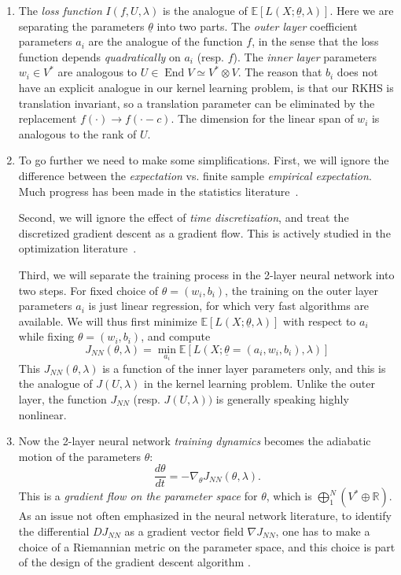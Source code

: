 \documentclass[a4paper]{article}
\theoremstyle{definition}
\newcommand{\R}{\mathbb{R}}
\newcommand{\E}{\mathbb{E}}
\newcommand{\1}{\mathbbm{1}}
\DeclareMathOperator{\End}{End}
\begin{document}
	\begin{enumerate}
		\item The \emph{loss function} $I(f,U,\lambda)$ is the analogue of $\E[L(X; \underline{\theta},\lambda)]$. Here we are separating the parameters $\underline{\theta}$ into two parts. The \emph{outer layer} coefficient parameters $a_i$ are the analogue of the function $f$, in the sense that the loss function depends \emph{quadratically} on $a_i$ (resp. $f$).
		The \emph{inner layer} parameters $w_i\in V^*$ are analogous to $U\in \End{V}\simeq V^*\otimes V$. The reason that $b_i$ does not have an explicit analogue in our kernel learning problem, is that our RKHS is translation invariant, so a translation parameter can be eliminated by the replacement $f(\cdot)\to f(\cdot-c)$. The dimension for the linear span of $w_i$ is analogous to the rank of  $U$. 
		
		
		
		\item   To go further we need to make some simplifications. First, we will ignore the difference between the \emph{expectation}  vs. finite sample \emph{empirical expectation}. Much progress has been made in the statistics literature~\cite{DevroyeGyLugosi, GyorfiKoKrWa}.
		
		
		Second, we will ignore the effect of \emph{time discretization}, and treat the discretized gradient descent as a gradient flow. This is actively studied in the optimization literature~\cite{HelmkeMoore, KushnerYin}.
		
		
		Third, we will separate the training process in the 2-layer neural network into two steps. For fixed choice of $\theta=(w_i, b_i)$, the training on the outer layer parameters $a_i$  is just linear regression, for which very fast algorithms are available. We will thus first minimize $\E[L(X; \underline{\theta} ,\lambda   )]$ with respect to $a_i$ while fixing $\theta=(w_i, b_i)$, and compute 
		\[
		J_{NN}(\theta, \lambda)= \min_{a_i} \E[  L(X; \underline{\theta}=(a_i, w_i,b_i) ,\lambda   )         ]
		\]
		This $J_{NN}(\theta,\lambda)$ is a function of the inner layer parameters only, and this is the analogue of $J(U,\lambda)$ in the kernel learning problem. Unlike the outer layer, the function $J_{NN}$ (resp. $J(U,\lambda))$ is generally speaking highly nonlinear.
		
		
		
		
		\item  Now the 2-layer neural network \emph{training dynamics} becomes the adiabatic motion of the parameters $\theta$:
		\begin{equation}\label{eqn:gradflowNN}
			\frac{d\theta }{dt}= - \nabla_\theta J_{NN} (\theta, \lambda).
		\end{equation}
		This is a \emph{gradient flow on the parameter space} for $\theta$, which is $\bigoplus_1^N (V^*\oplus \R)$.
		As an issue not often emphasized in the neural network literature,  to identify the differential $DJ_{NN}$ as a gradient vector field $\nabla J_{NN}$, one has to make a choice of a Riemannian metric on the parameter space, and this choice is part of the design of the gradient descent algorithm \cite{AbsilMaSe08, Boumal20}.
		

\end{enumerate}
\end{document}

